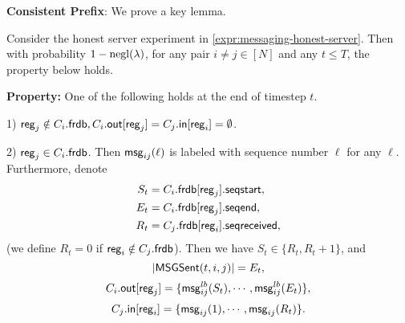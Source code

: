 \textbf{Consistent Prefix}: We prove a key lemma.
\begin{lemma}
\label{lem:messaging-correctness-main}
Consider the honest server experiment in \cref{expr:messaging-honest-server}. Then with probability $1 - \operatorname{negl}(\lambda)$, for any pair $i \neq j \in [N]$ and any $t \leq T$, the property below holds.

\textbf{Property: }One of the following holds at the end of timestep $t$.

1) $\mathsf{reg}_j \notin C_i.\mathsf{frdb}, C_i.\mathsf{out}[\mathsf{reg}_j] = C_j.\mathsf{in}[\mathsf{reg}_i] = \emptyset$.

2) $\mathsf{reg}_j \in C_i.\mathsf{frdb}$. Then $\mathsf{msg}_{ij}(\ell)$ is labeled with sequence number $\ell$ for any $\ell$. Furthermore, denote
\begin{align*}
S_t &= C_i.\mathsf{frdb}[\mathsf{reg}_j].\mathsf{seqstart}, \\
E_t &= C_i.\mathsf{frdb}[\mathsf{reg}_j].\mathsf{seqend}, \\
R_t &= C_j.\mathsf{frdb}[\mathsf{reg}_i].\mathsf{seqreceived},
\end{align*}
(we define $R_t = 0$ if $\mathsf{reg}_i \notin C_j.\mathsf{frdb}$). Then we have $S_t \in \{R_t, R_t + 1\}$, and
$$\left| \mathsf{MSGSent}(t, i, j) \right| = E_t,$$
$$C_i.\mathsf{out}[\mathsf{reg}_j] = \{\mathsf{msg}^{lb}_{ij}(S_t), \cdots, \mathsf{msg}^{lb}_{ij}(E_t)\},$$
$$C_j.\mathsf{in}[\mathsf{reg}_i] = \{\mathsf{msg}_{ij}(1), \cdots, \mathsf{msg}_{ij}(R_t)\}.$$
\end{lemma}
